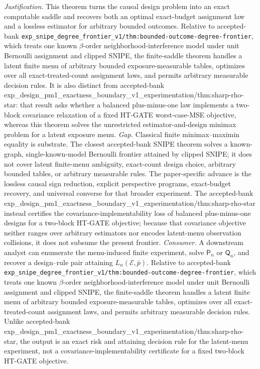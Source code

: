 \documentclass{article}
\begin{document}
\par\smallskip\noindent \textit{Justification.} This theorem turns the causal design problem into an exact computable saddle and recovers both an optimal exact-budget assignment law and a lossless estimator for arbitrary bounded outcomes. Relative to accepted-bank \texttt{exp\_snipe\_degree\_frontier\_v1/thm:bounded-outcome-degree-frontier}, which treats one known \(\beta\)-order neighborhood-interference model under unit Bernoulli assignment and clipped SNIPE, the finite-saddle theorem handles a latent finite menu of arbitrary bounded exposure-measurable tables, optimizes over all exact-treated-count assignment laws, and permits arbitrary measurable decision rules. It is also distinct from accepted-bank exp\_design\_pm1\_exactness\_boundary\_v1\_experimentation/thm:sharp-rho-star: that result asks whether a balanced plus-minus-one law implements a two-block covariance relaxation of a fixed HT-GATE worst-case-MSE objective, whereas this theorem solves the unrestricted estimator-and-design minimax problem for a latent exposure menu. \textit{Gap.} Classical finite minimax--maximin equality is substrate. The closest accepted-bank SNIPE theorem solves a known-graph, single-known-model Bernoulli frontier attained by clipped SNIPE; it does not cover latent finite-menu ambiguity, exact-count design choice, arbitrary bounded tables, or arbitrary measurable rules. The paper-specific advance is the lossless causal sign reduction, explicit perspective programs, exact-budget recovery, and universal converse for that broader experiment. The accepted-bank exp\_design\_pm1\_exactness\_boundary\_v1\_experimentation/thm:sharp-rho-star instead certifies the covariance-implementability loss of balanced plus-minus-one designs for a two-block HT-GATE objective; because that covariance objective neither ranges over arbitrary estimators nor encodes latent-menu observation collisions, it does not subsume the present frontier. \textit{Consumer.} A downstream analyst can enumerate the menu-induced finite experiment, solve \(\mathsf P_n\) or \(\mathsf Q_n\), and recover a design--rule pair attaining \(L_n(\mathcal E,\bar p)\). Relative to accepted-bank \texttt{exp\_snipe\_degree\_frontier\_v1/thm:bounded-outcome-degree-frontier}, which treats one known \(\beta\)-order neighborhood-interference model under unit Bernoulli assignment and clipped SNIPE, the finite-saddle theorem handles a latent finite menu of arbitrary bounded exposure-measurable tables, optimizes over all exact-treated-count assignment laws, and permits arbitrary measurable decision rules. Unlike accepted-bank exp\_design\_pm1\_exactness\_boundary\_v1\_experimentation/thm:sharp-rho-star, the output is an exact risk and attaining decision rule for the latent-menu experiment, not a covariance-implementability certificate for a fixed two-block HT-GATE objective.
\end{document}
